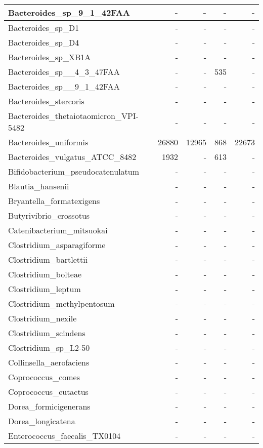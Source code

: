 \documentclass[12pt,a4paper]{article}
\begin{document}
\begin{table}[ht]
\begin{center}
\begin{tabular}{|l*{4}{|r}|}
Bacteroides\_sp\_9\_1\_42FAA & - & - & - & - \\ \hline
Bacteroides\_sp\_D1 & - & - & - & - \\ \hline
Bacteroides\_sp\_D4 & - & - & - & - \\ \hline
Bacteroides\_sp\_XB1A & - & - & - & - \\ \hline
Bacteroides\_sp\_\_4\_3\_47FAA & - & - & 535 & - \\ \hline
Bacteroides\_sp\_\_9\_1\_42FAA & - & - & - & - \\ \hline
Bacteroides\_stercoris & - & - & - & - \\ \hline
Bacteroides\_thetaiotaomicron\_VPI-5482 & - & - & - & - \\ \hline
Bacteroides\_uniformis & 26880 & 12965 & 868 & 22673 \\ \hline
Bacteroides\_vulgatus\_ATCC\_8482 & 1932 & - & 613 & - \\ \hline
Bifidobacterium\_pseudocatenulatum & - & - & - & - \\ \hline
Blautia\_hansenii & - & - & - & - \\ \hline
Bryantella\_formatexigens & - & - & - & - \\ \hline
Butyrivibrio\_crossotus & - & - & - & - \\ \hline
Catenibacterium\_mitsuokai & - & - & - & - \\ \hline
Clostridium\_asparagiforme & - & - & - & - \\ \hline
Clostridium\_bartlettii & - & - & - & - \\ \hline
Clostridium\_bolteae & - & - & - & - \\ \hline
Clostridium\_leptum & - & - & - & - \\ \hline
Clostridium\_methylpentosum & - & - & - & - \\ \hline
Clostridium\_nexile & - & - & - & - \\ \hline
Clostridium\_scindens & - & - & - & - \\ \hline
Clostridium\_sp\_L2-50 & - & - & - & - \\ \hline
Collinsella\_aerofaciens & - & - & - & - \\ \hline
Coprococcus\_comes & - & - & - & - \\ \hline
Coprococcus\_eutactus & - & - & - & - \\ \hline
Dorea\_formicigenerans & - & - & - & - \\ \hline
Dorea\_longicatena & - & - & - & - \\ \hline
Enterococcus\_faecalis\_TX0104 & - & - & - & - \\ \hline

\end{tabular}
\end{center}
\end{table}
\end{document}

